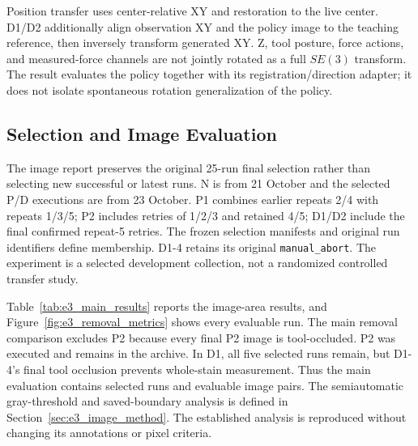 Position transfer uses center-relative XY and restoration to the live center. D1/D2 additionally align observation XY and the policy image to the teaching reference, then inversely transform generated XY. Z, tool posture, force actions, and measured-force channels are not jointly rotated as a full \(SE(3)\) transform. The result evaluates the policy together with its registration/direction adapter; it does not isolate spontaneous rotation generalization of the policy.

\subsection{Selection and Image Evaluation}
The image report preserves the original 25-run final selection rather than selecting new successful or latest runs. N is from 21 October and the selected P/D executions are from 23 October. P1 combines earlier repeats 2/4 with repeats 1/3/5; P2 includes retries of 1/2/3 and retained 4/5; D1/D2 include the final confirmed repeat-5 retries. The frozen selection manifests and original run identifiers define membership. D1-4 retains its original \texttt{manual\_abort}. The experiment is a selected development collection, not a randomized controlled transfer study.

Table~\ref{tab:e3_main_results} reports the image-area results, and Figure~\ref{fig:e3_removal_metrics} shows every evaluable run. The main removal comparison excludes P2 because every final P2 image is tool-occluded. P2 was executed and remains in the archive. In D1, all five selected runs remain, but D1-4's final tool occlusion prevents whole-stain measurement. Thus the main evaluation contains \EthreeMainN{} selected runs and \EthreeImageN{} evaluable image pairs. The semiautomatic gray-threshold and saved-boundary analysis is defined in Section~\ref{sec:e3_image_method}. The established analysis is reproduced without changing its annotations or pixel criteria.

\begin{table}[H]\centering\footnotesize
\caption[E3 image-based stain-area removal]{Main E3 removal results, mean \(\pm\) sample SD over image-evaluable runs. All conditions contain five selected executions. D1 image \(n=4\) means four evaluable pairs, not a 4/5 success rate; D1-4 is final-tool-occluded. P2's five occluded runs are archived outside this main table.}
\label{tab:e3_main_results}
\end{table}

